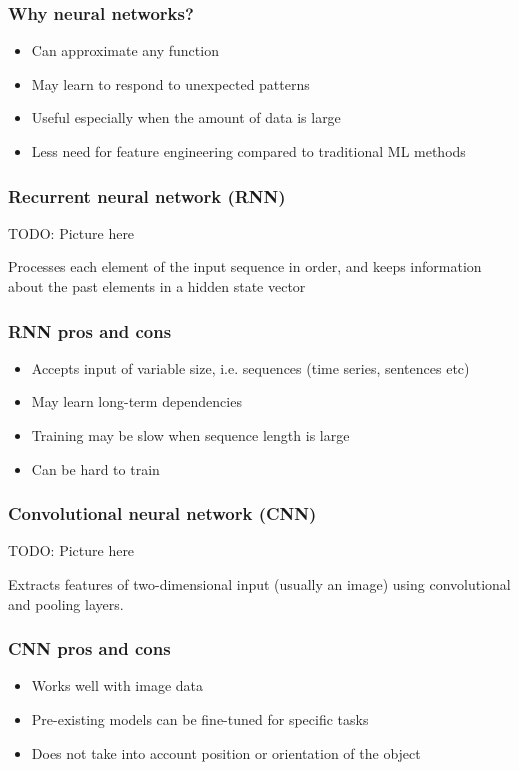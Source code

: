 \documentclass{beamer}
\newcommand\pro{\item[$+$]}
\newcommand\con{\item[$-$]}
\begin{document}
  \begin{frame}
    \frametitle{Why neural networks?}  
    
   	\begin{itemize}
		\item Can approximate any function \cite{hornik}
		\item May learn to respond to unexpected patterns
		\item Useful especially when the amount of data is large
		\item Less need for feature engineering compared to traditional ML methods
	\end{itemize}
  \end{frame}
  
  \begin{frame}
    \frametitle{Recurrent neural network (RNN)}  
    
	TODO: Picture here   
	
	Processes each element of the input sequence in order, and keeps information about the past elements in a hidden state vector

  \end{frame}  
  
  \begin{frame}
    \frametitle{RNN pros and cons}  
    
   	\begin{itemize}
		\pro Accepts input of variable size, i.e. sequences (time series, sentences etc)
		\pro May learn long-term dependencies
		\con Training may be slow when sequence length is large
		\con Can be hard to train
	\end{itemize}
  \end{frame}    

  \begin{frame}
    \frametitle{Convolutional neural network (CNN)}  
    
	TODO: Picture here    

  Extracts features of two-dimensional input (usually an image) using convolutional and pooling layers.

  \end{frame}  
  
  \begin{frame}
    \frametitle{CNN pros and cons}  
    
   	\begin{itemize}
		\pro Works well with image data
		\con Pre-existing models can be fine-tuned for specific tasks
		\con Does not take into account position or orientation of the object
	\end{itemize}
  \end{frame}    
\end{document}
